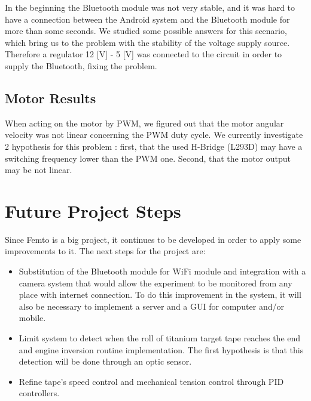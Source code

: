 \documentclass[journal]{IEEEtran}
\begin{document}
In the beginning the Bluetooth module was not very stable, and it was hard to have a connection between the Android system and the Bluetooth module for more than some seconds. We studied some possible answers for this scenario, which bring us to the problem with the stability of the voltage supply source. Therefore a regulator 12 [V] - 5 [V] was connected to the circuit in order to supply the Bluetooth, fixing the problem.

\subsection{Motor Results}

When acting on the motor by PWM, we figured out that the motor angular velocity was not linear concerning the PWM duty cycle. We currently investigate 2 hypothesis for this problem : first, that the used H-Bridge (L293D) \cite{IEEEhowto:L293D} may have a switching frequency lower than the PWM one. Second, that the motor output may be not linear.

\section{Future Project Steps}

Since Femto is a big project, it continues to be developed in order to apply some improvements to it. The next steps for the project are: 



\begin{itemize}
\item Substitution of the Bluetooth module for WiFi module and integration with a camera system that would allow the experiment to be monitored from any place with internet connection. To do this improvement in the system, it will also be necessary to implement a server and a GUI for computer and/or mobile.
\item Limit system to detect when the roll of titanium target tape reaches the end and engine inversion routine implementation. The first hypothesis is that this detection will be done through an optic sensor.
\item Refine tape's speed control and mechanical tension control through PID controllers.
\end{itemize}
\end{document}
